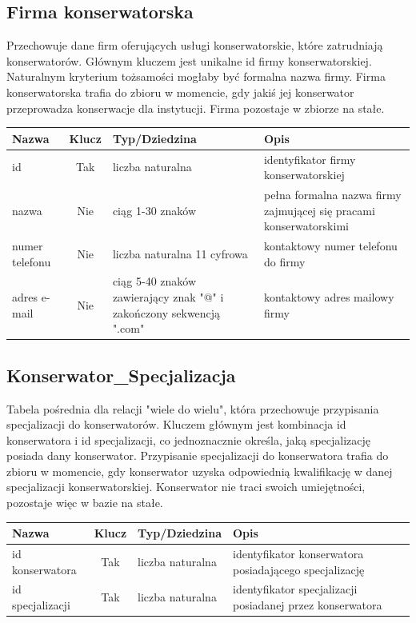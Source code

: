 \documentclass{article}
\begin{document}
\subsection*{Firma konserwatorska}
Przechowuje dane firm oferujących usługi konserwatorskie, które zatrudniają konserwatorów. Głównym kluczem jest unikalne id firmy konserwatorskiej. Naturalnym kryterium tożsamości mogłaby być formalna nazwa firmy. Firma konserwatorska trafia do zbioru w momencie, gdy jakiś jej konserwator przeprowadza konserwacje dla instytucji. Firma pozostaje w zbiorze na stałe.  
\begin{longtable}{|C{3cm}|c|C{4.5cm}|C{5cm}|}
\hline
\textbf{Nazwa} & \textbf{Klucz} & \textbf{Typ/Dziedzina} & \textbf{Opis} \\ \hline
id & Tak & liczba naturalna & identyfikator firmy konserwatorskiej \\ \hline 
nazwa & Nie & ciąg 1-30 znaków & pełna formalna nazwa firmy zajmującej się pracami konserwatorskimi \\ \hline 
numer telefonu & Nie & liczba naturalna 11 cyfrowa & kontaktowy numer telefonu do firmy \\ \hline
adres e-mail & Nie & ciąg 5-40 znaków zawierający znak "@" i zakończony sekwencją ".com" & kontaktowy adres mailowy firmy \\ \hline
\end{longtable}

\subsection*{Konserwator\_Specjalizacja}
Tabela pośrednia dla relacji "wiele do wielu", która przechowuje przypisania specjalizacji do konserwatorów. Kluczem głównym jest kombinacja id konserwatora i id specjalizacji, co jednoznacznie określa, jaką specjalizację posiada dany konserwator. Przypisanie specjalizacji do konserwatora trafia do zbioru w momencie, gdy konserwator uzyska odpowiednią kwalifikację w danej specjalizacji konserwatorskiej. Konserwator nie traci swoich umiejętności, pozostaje więc w bazie na stałe.  
\begin{longtable}{|C{3cm}|c|C{4.5cm}|C{5cm}|}
\hline
\textbf{Nazwa} & \textbf{Klucz} & \textbf{Typ/Dziedzina} & \textbf{Opis} \\ \hline
id konserwatora & Tak & liczba naturalna & identyfikator konserwatora posiadającego specjalizację \\ \hline
id specjalizacji & Tak & liczba naturalna & identyfikator specjalizacji posiadanej przez konserwatora \\ \hline
\end{longtable}
\end{document}
